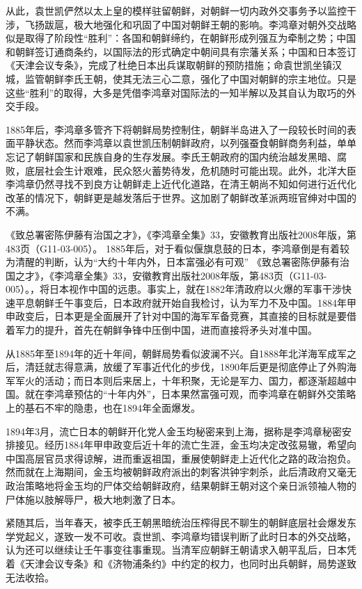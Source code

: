 \documentclass[12pt,UTF8]{ctexbook}
\begin{document}
从此，袁世凯俨然以太上皇的模样驻留朝鲜，对朝鲜一切内政外交事务予以监控干涉，飞扬跋扈，极大地强化和巩固了中国对朝鲜王朝的影响。李鸿章对朝外交战略似是取得了阶段性“胜利”：各国和朝鲜缔约，在朝鲜形成列强互为牵制之势；中国和朝鲜签订通商条约，以国际法的形式确定中朝间具有宗藩关系；中国和日本签订《天津会议专条》，完成了杜绝日本出兵谋取朝鲜的预防措施；命袁世凯坐镇汉城，监管朝鲜李氏王朝，使其无法三心二意，强化了中国对朝鲜的宗主地位。只是这些“胜利”的取得，大多是凭借李鸿章对国际法的一知半解以及其自认为取巧的外交手段。

1885年后，李鸿章多管齐下将朝鲜局势控制住，朝鲜半岛进入了一段较长时间的表面平静状态。然而李鸿章以袁世凯压制朝鲜政府，以列强蚕食朝鲜商务利益，单单忘记了朝鲜国家和民族自身的生存发展。李氏王朝政府的国内统治越发黑暗、腐败，底层社会生计艰难，民众怒火蓄势待发，危机随时可能出现。此外，北洋大臣李鸿章仍然寻找不到良方让朝鲜走上近代化道路，在清王朝尚不知如何进行近代化改革的情况下，朝鲜更是越发落后于世界。这加剧了朝鲜改革派两班官绅对中国的不满。

《致总署密陈伊藤有治国之才》，《李鸿章全集》33，安徽教育出版社2008年版，第483页（G11-03-005）。
1885年后，对于看似偃旗息鼓的日本，李鸿章倒是有着较为清醒的判断，认为“大约十年内外，日本富强必有可观” 《致总署密陈伊藤有治国之才》，《李鸿章全集》33，安徽教育出版社2008年版，第483页（G11-03-005）。，将日本视作中国的远患。事实上，就在1882年清政府以火爆的军事干涉快速平息朝鲜壬午事变后，日本政府就开始自我检讨，认为军力不及中国。1884年甲申政变后，日本更是全面展开了针对中国的海军军备竞赛，其直接的目标就是要借着军力的提升，首先在朝鲜争锋中压倒中国，进而直接将矛头对准中国。

从1885年至1894年的近十年间，朝鲜局势看似波澜不兴。自1888年北洋海军成军之后，清廷就志得意满，放缓了军事近代化的步伐，1890年后更是彻底停止了外购海军军火的活动；而日本则后来居上，十年积聚，无论是军力、国力，都逐渐超越中国。就在李鸿章预估的“十年内外”，日本果然富强可观，而李鸿章在朝鲜外交策略上的基石不牢的隐患，也在1894年全面爆发。

1894年3月，流亡日本的朝鲜开化党人金玉均秘密来到上海，据称是李鸿章秘密安排接见。经历1884年甲申政变后近十年的流亡生涯，金玉均决定改弦易辙，希望向中国高层官员求得谅解，进而重返祖国，重展使朝鲜走上近代化之路的政治抱负。然而就在上海期间，金玉均被朝鲜政府派出的刺客洪钟宇刺杀，此后清政府又毫无政治策略地将金玉均的尸体交给朝鲜政府，结果朝鲜王朝对这个亲日派领袖人物的尸体施以肢解辱尸，极大地刺激了日本。

紧随其后，当年春天，被李氏王朝黑暗统治压榨得民不聊生的朝鲜底层社会爆发东学党起义，遂致一发不可收。袁世凯、李鸿章均错误判断了此时日本的外交战略，认为还可以继续让壬午事变往事重现。当清军应朝鲜王朝请求入朝平乱后，日本凭着《天津会议专条》和《济物浦条约》中约定的权力，也同时出兵朝鲜，局势遂致无法收拾。
\end{document}

